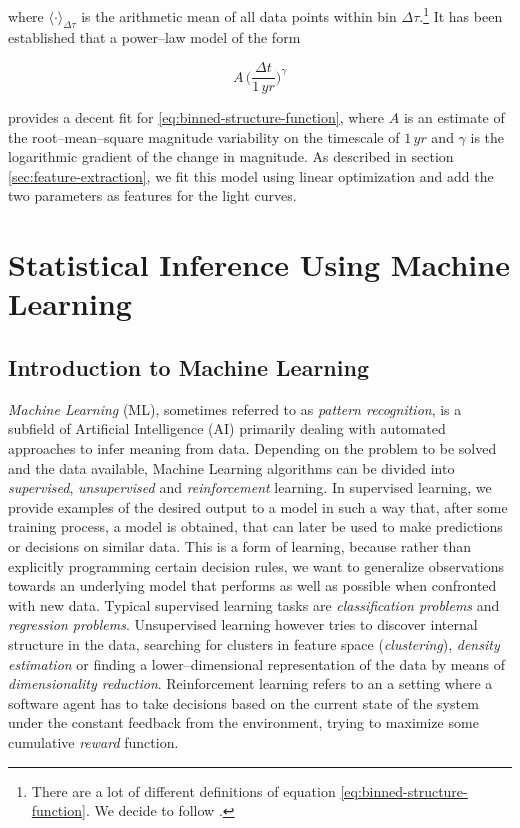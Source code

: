 where $\langle \cdot \rangle_{\Delta \tau}$ is the arithmetic mean of all data points within bin $\Delta \tau$.\footnote{There are a lot of different definitions of equation \eqref{eq:binned-structure-function}. We decide to follow \citet{schmidt2010}.} It has been established \citep{richards2006} that a power--law model of the form

\begin{equation}
A \, \big(\frac{\Delta t}{1 \, \unit{yr}}\big)^\gamma
\end{equation}

provides a decent fit for \eqref{eq:binned-structure-function}, where $A$ is an estimate of the root--mean--square magnitude variability on the timescale of $1 \, \unit{yr}$ and $\gamma$ is the logarithmic gradient of the change in magnitude. As described in section \ref{sec:feature-extraction}, we fit this model using linear optimization and add the two parameters as features for the light curves.

\section{Statistical Inference Using Machine Learning}

\subsection{Introduction to Machine Learning}
\label{sec:introduction-machine-learning}

\emph{Machine Learning} (ML), sometimes referred to as \emph{pattern recognition}, is a subfield of Artificial Intelligence (AI) primarily dealing with automated approaches to infer meaning from data. Depending on the problem to be solved and the data available, Machine Learning algorithms can be divided into \emph{supervised}, \emph{unsupervised} and \emph{reinforcement} learning. In supervised learning, we provide examples of the desired output to a model in such a way that, after some training process, a model is obtained, that can later be used to make predictions or decisions on similar data. This is a form of learning, because rather than explicitly programming certain decision rules, we want to generalize observations towards an underlying model that performs as well as possible when confronted with new data. Typical supervised learning tasks are \emph{classification problems} and \emph{regression problems}. Unsupervised learning however tries to discover internal structure in the data, \eg searching for clusters in feature space (\emph{clustering}), \emph{density estimation} or finding a lower--dimensional representation of the data by means of \emph{dimensionality reduction}. Reinforcement learning refers to an a setting where a software agent has to take decisions based on the current state of the system under the constant feedback from the environment, trying to maximize some cumulative \emph{reward} function.\\

